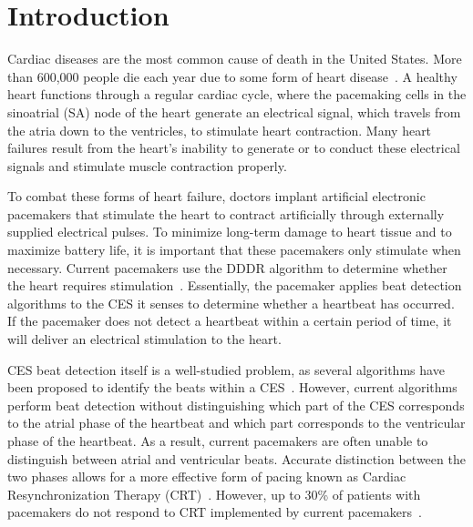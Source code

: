 \documentclass[conference]{IEEEtran}
\begin{document}




%
\IEEEpeerreviewmaketitle



\section{Introduction}
Cardiac diseases are the most common cause of death in
the United States. More than 600,000 people die each year
due to some form of heart disease~\cite{death-stats}. A healthy heart
functions through a regular cardiac cycle, where the pacemaking cells
in the sinoatrial (SA) node of the heart
generate an electrical signal, which travels from the atria
down to the ventricles, to stimulate heart contraction.
Many heart failures result from the heart's inability to
generate or to conduct these electrical signals
and stimulate muscle contraction properly. %

To combat these forms of heart failure, doctors implant artificial electronic pacemakers
that stimulate the heart
to contract artificially through externally supplied
electrical pulses.
To minimize long-term damage to heart tissue and to maximize battery life, it is important that these pacemakers only stimulate when necessary.
Current pacemakers use the 
DDDR algorithm to determine whether
the heart requires stimulation~\cite{basic-pacing}.
Essentially, the pacemaker applies beat detection algorithms to the CES it senses
to determine whether a
heartbeat has occurred. If the pacemaker does not detect a heartbeat
within a certain period of time, it will deliver an
electrical stimulation to the heart.

CES beat detection itself is a well-studied problem, as
several algorithms have been proposed to identify the
beats within a CES~\cite{realtime-qrs, ecg-filter}. However, current
algorithms perform beat detection without distinguishing
which part of the CES corresponds to the atrial
phase of the heartbeat and which part corresponds to %
the ventricular phase of the heartbeat. As a result,
current pacemakers are often unable to distinguish
between atrial and ventricular beats.
Accurate distinction between the two phases allows for a more effective form of pacing known as
Cardiac Resynchronization Therapy (CRT)~\cite{multisite-crt}.
However, up to 30\% of patients with pacemakers do %
not respond to CRT implemented by current pacemakers~\cite{multisite-crt}. %
\end{document}
